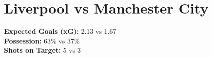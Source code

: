 \documentclass[a4paper]{article}
\begin{document}
\section*{Liverpool vs Manchester City}
\textbf{Expected Goals (xG):} 2.13 vs 1.67 \\
\textbf{Possession:} 63\% vs 37\% \\
\textbf{Shots on Target:} 5 vs 3 \\
\end{document}

